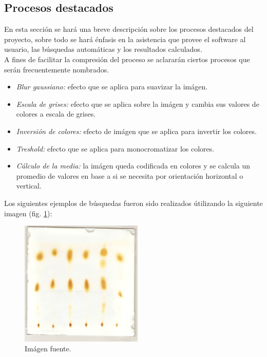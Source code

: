 \subsection{Procesos destacados}
En esta secci\'on se har\'a una breve descripci\'on sobre los procesos destacados del proyecto, sobre todo se har\'a \'enfasis en la asistencia que provee el software al usuario, las b\'usquedas autom\'aticas y los resultados calculados.\\
A fines de facilitar la compresi\'on del proceso se aclarar\'an ciertos procesos que ser\'an frecuentemente nombrados.
\begin{itemize}
	\renewcommand{\labelitemi}{$\bullet$}
	\renewcommand{\labelitemii}{$\circ$}
	
	\item \textit{Blur gaussiano:} efecto que se aplica para suavizar la im\'agen.
	\item \textit{Escala de grises:} efecto que se aplica sobre la im\'agen y cambia sus valores de colores a escala de grises.
	\item \textit{Inversi\'on de colores:} efecto de im\'agen que se aplica para invertir los colores.
	\item \textit{Treshold:} efecto que se aplica para monocromatizar los colores.
	\item \textit{C\'alculo de la media:} la im\'agen queda codificada en colores y se calcula un promedio de valores en base a si se necesita por orientaci\'on horizontal o vertical.
\end{itemize}

\vspace{0.5cm}
Los siguientes ejemplos de b\'usquedas fueron sido realizados \'utilizando la siguiente imagen (fig. \ref{fig:image-font}):

\begin{figure}[H]
	\vspace{-0.3cm}
	\centering
	\includegraphics[width=220px]{imagenes-jtlc/experimento/fuente}
	\centering
	\vspace{-0.4cm}
	\caption{Im\'agen fuente.}
	\label{fig:image-font}
	\vspace{-0.25cm}
\end{figure}
\newpage

